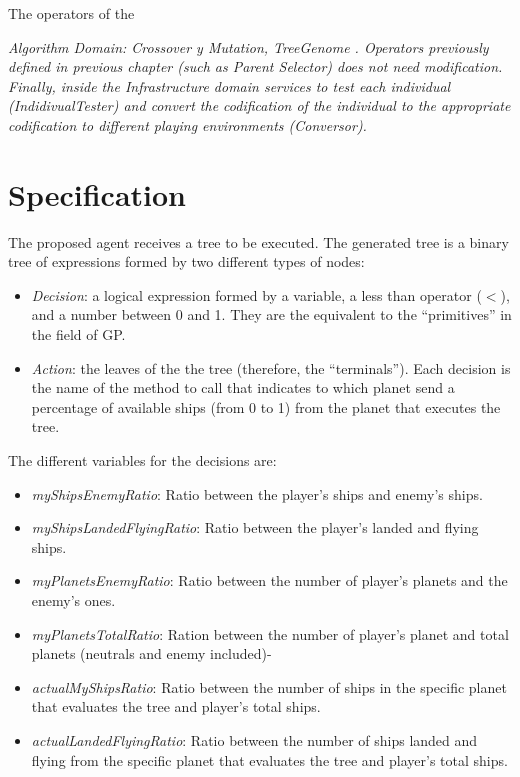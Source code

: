 The operators of the {\em Algorithm Domain: Crossover y Mutation, TreeGenome . Operators previously defined in previous chapter (such as Parent Selector) does not need modification.
Finally, inside the {\em Infrastructure domain} services to test each individual (\em IndidivualTester) and convert the codification of the individual to the appropriate codification to different playing environments ({\em Conversor}).

\section{Specification}

The proposed agent receives a tree to be executed. The generated tree
is a binary tree of expressions formed by two different types of nodes:

\begin{itemize}
\item {\em Decision}: a logical expression formed by a variable, a less than operator ($<$), and a number between 0 and 1. They are the equivalent to the ``primitives'' in the field of GP.
\item {\em Action}: the leaves of the the tree (therefore, the ``terminals''). Each decision is the name of the method to call that indicates to which planet send a percentage of available ships (from 0 to 1) from the planet that executes the tree. 
\end{itemize}

The different variables for the decisions are:

\begin{itemize}
\item {\em myShipsEnemyRatio}: Ratio between the player's ships and enemy's ships.
\item {\em myShipsLandedFlyingRatio}: Ratio between the player's landed and flying ships.
\item {\em myPlanetsEnemyRatio}: Ratio between the number of player's planets and the enemy's ones.
\item {\em myPlanetsTotalRatio}: Ration between the number of player's planet and total planets (neutrals and enemy included)-
\item {\em actualMyShipsRatio}: Ratio between the number of ships in the specific planet that evaluates the tree and player's total ships.
\item {\em actualLandedFlyingRatio}: Ratio between the number of ships landed and flying from the specific planet that evaluates the tree and player's total ships.
\end{itemize}

}
